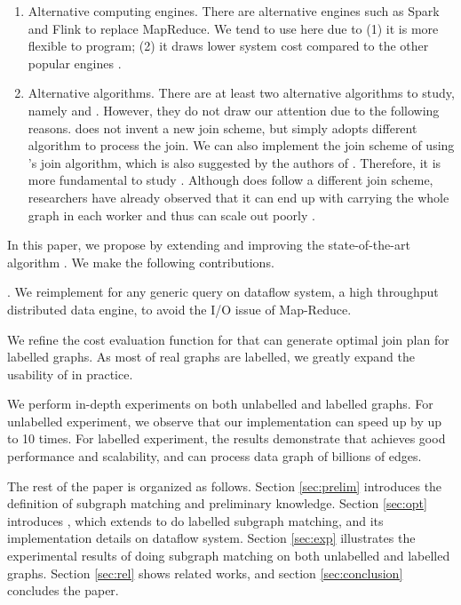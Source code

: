 \begin{enumerate}
    \item Alternative computing engines. There are alternative engines such as Spark \cite{spark} and Flink \cite{flink} to replace MapReduce. We tend to use \timely here due to (1) it is more flexible to program; (2) it draws lower system cost compared to the other popular engines \cite{McSherry2015}.
    \item Alternative algorithms. There are at least two alternative algorithms to study, namely \bigjoin and \multiwayjoin. However, they do not draw our attention due to the following reasons. \bigjoin does not invent a new join scheme, but simply adopts different algorithm to process the join. We can also implement the join scheme of \cliquejoin using \bigjoin's join algorithm, which is also suggested by the authors of \bigjoin \cite{Ammar2018}. Therefore, it is more fundamental to study \cliquejoin. Although \multiwayjoin does follow a different join scheme, researchers have already observed that it can end up with carrying the whole graph in each worker and thus can scale out poorly \cite{Lai2016, Ammar2018}.   
\end{enumerate}

 In this paper, we propose \gencliqjoin by extending and improving the state-of-the-art algorithm \cliquejoin. We make the following contributions.

\cite{Murray2013}. We reimplement \cliquejoin for any generic query on \timely dataflow system, a high throughput distributed data engine, to avoid the I/O issue of Map-Reduce. 

 We refine the cost evaluation function for \cliquejoin that can generate optimal join plan for labelled graphs. As most of real graphs are labelled, we greatly expand the usability of \cliquejoin in practice.

 We perform in-depth experiments on both unlabelled and labelled graphs. For unlabelled experiment, we observe that our implementation can speed up \cliquejoin by up to 10 times. For labelled experiment, the results demonstrate that \gencliqjoin achieves good performance and scalability, and can process data graph of billions of edges.

 The rest of the paper is organized as follows. Section \ref{sec:prelim} introduces the definition of subgraph matching and preliminary knowledge. Section \ref{sec:opt} introduces \gencliqjoin, which extends \cliquejoin to do labelled subgraph matching, and its implementation details on \timely dataflow system. Section \ref{sec:exp} illustrates the experimental results of doing subgraph matching on both unlabelled and labelled graphs. Section \ref{sec:rel} shows related works, and section \ref{sec:conclusion} concludes the paper.